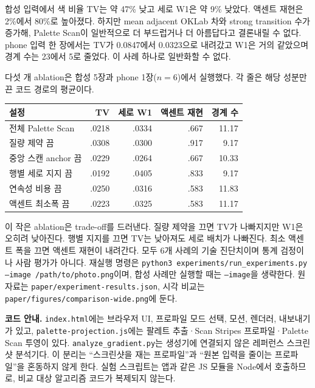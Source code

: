 \documentclass[10pt]{article}
\begin{document}
합성 입력에서 색 비율 TV는 약 47\% 낮고 세로 W1은 약 9\% 낮았다. 액센트 재현은 2\%에서 80\%로 높아졌다. 하지만 mean adjacent OKLab 차와 strong transition 수가 증가해, Palette Scan이 일반적으로 더 부드럽거나 더 아름답다고 결론내릴 수 없다. phone 입력 한 장에서는 TV가 0.0847에서 0.0323으로 내려갔고 W1은 거의 같았으며 경계 수는 23에서 5로 줄었다. 이 사례 하나로 일반화할 수 없다.

다섯 개 ablation은 합성 5장과 phone 1장($n=6$)에서 실행했다. 각 줄은 해당 성분만 끈 코드 경로의 평균이다.

\begin{center}
\footnotesize
\begin{tabular}{@{}lrrrr@{}}
\toprule
설정 & TV & 세로 W1 & 액센트 재현 & 경계 수 \\
\midrule
전체 Palette Scan & .0218 & .0334 & .667 & 11.17 \\
질량 제약 끔 & .0308 & .0300 & .917 & 9.17 \\
중앙 스캔 anchor 끔 & .0229 & .0264 & .667 & 10.33 \\
행별 세로 지지 끔 & .0192 & .0405 & .833 & 9.17 \\
연속성 비용 끔 & .0250 & .0316 & .583 & 11.83 \\
액센트 최소폭 끔 & .0223 & .0325 & .583 & 11.17 \\
\bottomrule
\end{tabular}
\end{center}

이 작은 ablation은 trade-off를 드러낸다. 질량 제약을 끄면 TV가 나빠지지만 W1은 오히려 낮아진다. 행별 지지를 끄면 TV는 낮아져도 세로 배치가 나빠진다. 최소 액센트 폭을 끄면 액센트 재현이 내려간다. 모두 6개 사례의 기술 진단치이며 통계 검정이나 사람 평가가 아니다. 재실행 명령은 \texttt{python3 experiments/run\_experiments.py --image /path/to/photo.png}이며, 합성 사례만 실행할 때는 \texttt{--image}을 생략한다. 원자료는 \texttt{paper/experiment-results.json}, 시각 비교는 \texttt{paper/figures/comparison-wide.png}에 둔다.

\textbf{코드 안내.} \texttt{index.html}에는 브라우저 UI, 프로파일 모드 선택, 모션, 렌더러, 내보내기가 있고, \texttt{palette-projection.js}에는 팔레트 추출·Scan Stripes 프로파일·Palette Scan 투영이 있다. \texttt{analyze\_gradient.py}는 생성기에 연결되지 않은 레퍼런스 스크린샷 분석기다. 이 분리는 “스크린샷을 재는 프로파일”과 “원본 입력을 줄이는 프로파일”을 혼동하지 않게 한다. 실험 스크립트는 앱과 같은 JS 모듈을 Node에서 호출하므로, 비교 대상 알고리즘 코드가 복제되지 않는다.
\end{document}
